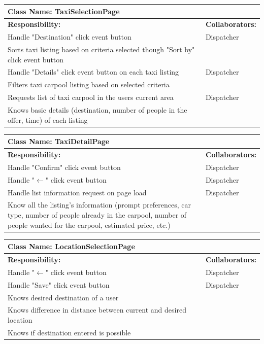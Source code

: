 \documentclass[]{article}
\begin{document}
	\begin{table}[H]
	\centering
	\begin{tabular}{|p{6cm}|p{6cm}|}
	\hline 
		\multicolumn{2}{|l|}{\textbf{Class Name: TaxiSelectionPage}} \\
	\hline
	\textbf{Responsibility:} & \textbf{Collaborators:} \\
	\hline
	Handle "Destination" click event button & Dispatcher \\ \hline
	Sorts taxi listing based on criteria selected though "Sort by" click event button & \\ \hline
	Handle "Details" click event button on each taxi listing & Dispatcher \\ \hline
	Filters taxi carpool listing based on selected criteria & \\ \hline
	Requests list of taxi carpool in the users current area & Dispatcher \\ \hline
	Knows basic details (destination, number of people in the offer, time) of each listing & \\ \hline
	\end{tabular}
	\end{table}
	
	\begin{table}[H]
	\centering
	\begin{tabular}{|p{6cm}|p{6cm}|}
	\hline 
		\multicolumn{2}{|l|}{\textbf{Class Name: TaxiDetailPage}} \\
	\hline
	\textbf{Responsibility:} & \textbf{Collaborators:} \\
	\hline
	Handle "Confirm" click event button & Dispatcher \\ \hline
	Handle "$\xleftarrow{}$" click event button & Dispatcher \\ \hline
	Handle list information request on page load & Dispatcher\\ \hline
	Know all the listing's information (prompt preferences, car type, number of people already in the carpool, number of people wanted for the carpool, estimated price, etc.)  & \\ \hline
	\end{tabular}
	\end{table}
	
	\begin{table}[H]
	\centering
	\begin{tabular}{|p{6cm}|p{6cm}|}
	\hline 
		\multicolumn{2}{|l|}{\textbf{Class Name: LocationSelectionPage}} \\
	\hline
	\textbf{Responsibility:} & \textbf{Collaborators:} \\
	\hline
	Handle "$\xleftarrow{}$" click event button & Dispatcher \\ \hline
	Handle "Save" click event button & Dispatcher\\ \hline
	Knows desired destination of a user & \\ \hline
	Knows difference in distance between current and desired location & \\ \hline
	Knows if destination entered is possible & \\ \hline
	\end{tabular}
	\end{table}
	
\end{document}
